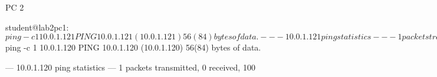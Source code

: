 PC 2

student@lab2pc1:~$ ping -c 1 10.0.1.121
PING 10.0.1.121 (10.0.1.121) 56(84) bytes of data.

--- 10.0.1.121 ping statistics ---
1 packets transmitted, 0 received, 100%

student@lab2pc1:~$ ping -c 1 10.0.1.120
PING 10.0.1.120 (10.0.1.120) 56(84) bytes of data.

--- 10.0.1.120 ping statistics ---
1 packets transmitted, 0 received, 100%

